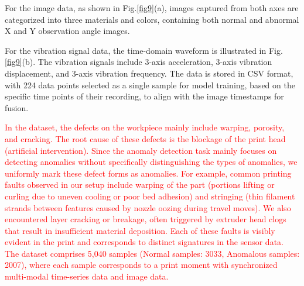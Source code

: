 \documentclass[preprint,12pt]{elsarticle}
\begin{document}
For the image data, as shown in Fig.\ref{fig9}(a), images captured from both axes are categorized into three materials and colors, containing both normal and abnormal X and Y observation angle images.

For the vibration signal data, the time-domain waveform is illustrated in Fig.\ref{fig9}(b). The vibration signals include 3-axis acceleration, 3-axis vibration displacement, and 3-axis vibration frequency. The data is stored in CSV format, with 224 data points selected as a single sample for model training, based on the specific time points of their recording, to align with the image timestamps for fusion.

\textcolor{red}{In the dataset, the defects on the workpiece mainly include warping, porosity, and cracking. The root cause of these defects is the blockage of the print head (artificial intervention). Since the anomaly detection task mainly focuses on detecting anomalies without specifically distinguishing the types of anomalies, we uniformly mark these defect forms as anomalies. For example, common printing faults observed in our setup include warping of the part (portions lifting or curling due to uneven cooling or poor bed adhesion) and stringing (thin filament strands between features caused by nozzle oozing during travel moves). We also encountered layer cracking or breakage, often triggered by extruder head clogs that result in insufficient material deposition. Each of these faults is visibly evident in the print and corresponds to distinct signatures in the sensor data. The dataset comprises 5,040 samples (Normal samples: 3033, Anomalous samples: 2007), where each sample corresponds to a print moment with synchronized multi-modal time-series data and image data.}
\end{document}

